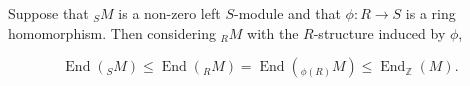 Suppose that $_S M$ is a non-zero left $S$-module and that $\phi: R \rightarrow S$ is a ring homomorphism. Then considering $_R M$ with the $R$-structure induced by $\phi$,

$$\operatorname{End}(_S M) \leq \operatorname{End}(_R M) = \operatorname{End}(_{\phi(R)} M) \leq \operatorname{End}_{\mathbb{Z}}(M).$$
